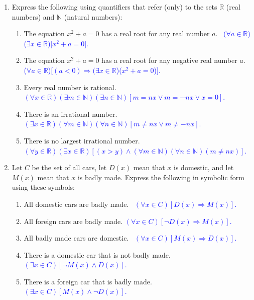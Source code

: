 \documentclass[13.5pt]{article}
\begin{document}
\begin{enumerate}
\item{Express the following using quantifiers that refer (only) to the sets \(\mathbb{R}\) (real numbers) and \(\mathbb{N}\) (natural numbers):}

\begin{enumerate}
\setlength{\itemindent}{.1in}
\item{The equation \(x^2+a=0\) has a real root for any real number \(a\).}\
\textcolor{blue} { (\(\forall a \in \mathbb{R}\))(\(\exists x \in \mathbb{R}\))[\(x^2+a=0\)]. }
\item{The equation \(x^2+a=0\) has a real root for any negative real number \(a\).}\
\textcolor{blue} { (\(\forall a\in \mathbb{R}\))[\((a<0)\Rightarrow(\exists x \in \mathbb{R}\))(\(x^2+a=0\))]. }
\item{Every real number is rational.}\
\textcolor{blue} { \((\forall x\in \mathbb{R})(\exists m \in \mathbb{N})(\exists n \in \mathbb{N})[m=nx \vee m=-nx \vee x=0]\). }
\item{There is an irrational number.}\
\textcolor{blue} { \((\exists x \in \mathbb{R})(\forall m\in \mathbb{N})(\forall n\in \mathbb{N})[m \neq nx \vee m \neq -nx]\). }
\item{There is no largest irrational number.}\
\textcolor{blue} { \((\forall y\in \mathbb{R})(\exists x\in \mathbb{R})[(x>y)\wedge(\forall m\in \mathbb{N})(\forall n\in \mathbb{N})(m \neq nx)]\). }
\end{enumerate}

\item{Let \(C\) be the set of all cars, let \(D(x)\) mean that \(x\) is domestic, and let \(M(x)\) mean that \(x\) is badly made. Express the following in symbolic form using these symbols:}

\begin{enumerate}
\setlength{\itemindent}{.1in}
\item{All domestic cars are badly made.}\
\textcolor{blue} { \((\forall x\in C)[D(x) \Rightarrow M(x)]\). }
\item{All foreign cars are badly made.}
\textcolor{blue} { \((\forall x\in C)[\neg D(x) \Rightarrow M(x)]\). }
\item{All badly made cars are domestic.}\
\textcolor{blue} { \((\forall x\in C)[M(x) \Rightarrow D(x)]\). }
\item{There is a domestic car that is not badly made.}\
\textcolor{blue} { \((\exists x\in C)[\neg M(x) \wedge D(x)]\). }
\item{There is a foreign car that is badly made.}\
\textcolor{blue} { \((\exists x\in C)[M(x) \wedge \neg D(x)]\). }
\end{enumerate}


\end{enumerate}
\end{document}
